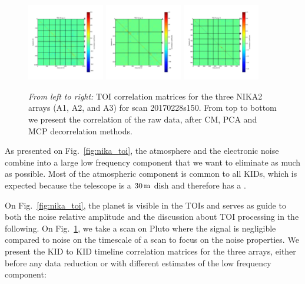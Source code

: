 \begin{figure}[ht!]
\begin{center}
\includegraphics[width=0.3\textwidth]{Figures/NoiseTests/corrmat_TOI_BCP_array_1_20170228s151.pdf}
\includegraphics[width=0.3\textwidth]{Figures/NoiseTests/corrmat_TOI_BCP_array_2_20170228s151.pdf}
\includegraphics[width=0.3\textwidth]{Figures/NoiseTests/corrmat_TOI_BCP_array_3_20170228s151.pdf}
\end{center}
\caption[KID-to-KID correlation matrices]{\emph{From left to right:} TOI correlation
  matrices for the three NIKA2 arrays (A1, A2, and A3) for scan
  20170228s150. From top to bottom we present the correlation of the raw data,
  after CM, PCA and MCP decorrelation methods. \label{corrmatrix}}
\end{figure}

As presented on Fig.~\ref{fig:nika_toi}, the atmosphere and the electronic noise
combine into a large low frequency component that we want to eliminate as much
as possible. Most of the atmospheric component is common to all KIDs, which is
expected because the telescope is a $30\,\rm{m}$ dish and therefore
has a . 

On Fig.~\ref{fig:nika_toi}, the planet is visible in the TOIs and serves as
guide to both the noise relative amplitude and the discussion about TOI
processing in the following. On Fig.~\ref{corrmatrix}, we take a scan on Pluto
where the signal is negligible compared to noise on the timescale of a scan to
focus on the noise properties. We present the KID to KID timeline correlation
matrices for the three arrays, either before any data reduction or with
different estimates of the low frequency component:

